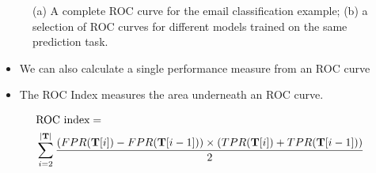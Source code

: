 \documentclass[xcolor={table}]{beamer}
\begin{document}
 \begin{frame} 
\begin{figure}[!bth]
       \begin{centering}
       \caption{(a) A complete ROC curve for the email classification example; (b) a selection of ROC curves for different models trained on the same prediction task.}
       \end{centering}
       \label{fig:rocPanels2}
\end{figure}
\end{frame} 

 \begin{frame} 
  \begin{itemize}
	\item We can also calculate a single performance measure from an ROC curve
	\item The \alert{ROC Index} measures the area underneath an ROC curve.
\end{itemize}
\begin{alignat}{2}
&\text{ROC index} = \notag\\ 
&\sum_{i=2}^{|\mathbf{T}|} \frac{\left( FPR(\mathbf{T}[i]) - FPR(\mathbf{T}[i-1]) \right) \times  \left( TPR(\mathbf{T}[i]) + TPR(\mathbf{T}[i-1])\right)}{2} \label{eqn:rocIndex}
\end{alignat}
\end{frame} 
\end{document}
